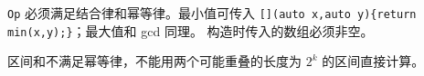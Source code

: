 \texttt{Op} 必须满足结合律和幂等律。最小值可传入
\texttt{[](auto x,auto y)\{return min(x,y);\}}；最大值和 gcd 同理。
构造时传入的数组必须非空。

区间和不满足幂等律，不能用两个可能重叠的长度为 $2^k$ 的区间直接计算。
